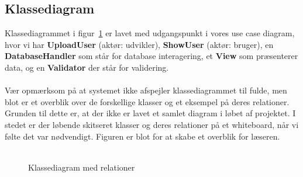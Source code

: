 \subsection{Klassediagram}
Klassediagrammet i figur~\ref{fig:klassediagram} er lavet med udgangspunkt i vores use case diagram, hvor vi har \textbf{UploadUser} (aktør: udvikler), \textbf{ShowUser} (aktør: bruger), en \textbf{DatabaseHandler} som står for database interagering, et \textbf{View} som præsenterer data, og en \textbf{Validator} der står for validering.
\\\\
Vær opmærksom på at systemet ikke afspejler klassediagrammet til fulde, men blot er et overblik over de forskellige klasser og et eksempel på deres relationer.
Grunden til dette er, at der ikke er lavet et samlet  diagram i løbet af projektet.
I stedet er der løbende skitseret klasser og deres relationer på et whiteboard, når vi følte det var nødvendigt.
Figuren er blot for at skabe et overblik for læseren.
\\\\
\begin{figure}[H]
\caption{Klassediagram med relationer}
\label{fig:klassediagram}
\end{figure}
